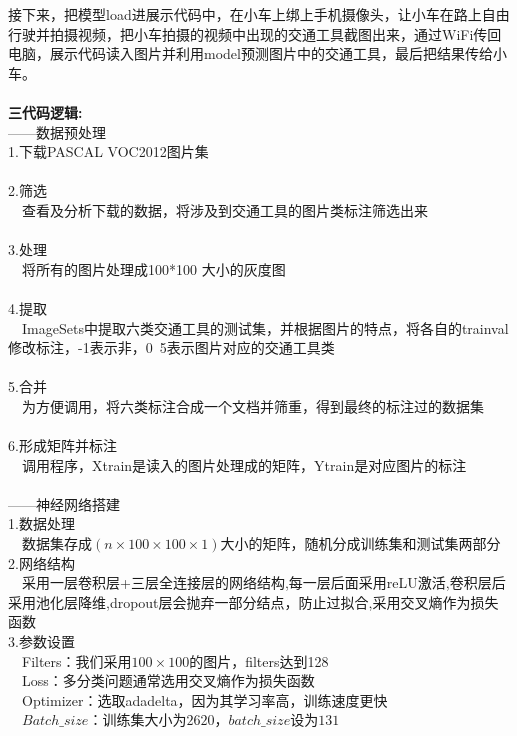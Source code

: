 \documentclass[19pt,a4paper]{article}
\begin{document}
\indent 接下来，把模型load进展示代码中，在小车上绑上手机摄像头，让小车在路上自由行驶并拍摄视频，把小车拍摄的视频中出现的交通工具截图出来，通过WiFi传回电脑，展示代码读入图片并利用model预测图片中的交通工具，最后把结果传给小车。
\\
\\
\indent\textbf{三\quad 代码逻辑:}\\
\indent ——数据预处理\\
\indent 1.下载PASCAL VOC2012图片集\\
\\
\indent 2.筛选\\
\indent \ \ 查看及分析下载的数据，将涉及到交通工具的图片类标注筛选出来\\
\\
\indent 3.处理\\
\indent \ \ 将所有的图片处理成100*100 大小的灰度图\\
\\
\indent 4.提取\\
\indent\ \ ImageSets中提取六类交通工具的测试集，并根据图片的特点，将各自的trainval修改标注，-1表示非，0~5表示图片对应的交通工具类 \\
\\
\indent 5.合并\\
\indent \ \ 为方便调用，将六类标注合成一个文档并筛重，得到最终的标注过的数据集\\
\\
\indent 6.形成矩阵并标注\\
\indent \ \ 调用程序，Xtrain是读入的图片处理成的矩阵，Ytrain是对应图片的标注\\
\\
\indent ——神经网络搭建\\
\indent 1.数据处理\\
\indent\ \ 数据集存成$(n \times100 \times100 \times 1)$大小的矩阵，随机分成训练集和测试集两部分\\
\indent 2.网络结构\\
\indent\ \ 采用一层卷积层+三层全连接层的网络结构,每一层后面采用reLU激活,卷积层后采用池化层降维,dropout层会抛弃一部分结点，防止过拟合,采用交叉熵作为损失函数\\
\indent 3.参数设置\\
\indent\ \ Filters：我们采用$100\times100$的图片，filters达到128\\
\indent\ \ Loss：多分类问题通常选用交叉熵作为损失函数\\
\indent\ \ Optimizer：选取adadelta，因为其学习率高，训练速度更快\\
\indent\ \ $Batch\_size：训练集大小为2620，batch\_size设为131$\\
\end{document}
